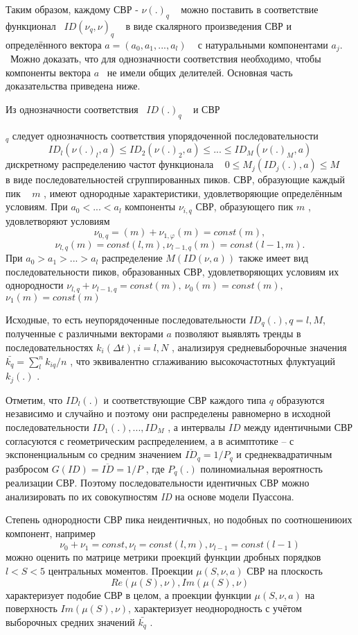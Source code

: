 {{{{ Таким образом, каждому СВР - }$\nu(.)_{q}${ ~ можно
поставить в соответствие функционал ~}$ID(\nu_{q},\nu)_{q}${ ~ в виде
скалярного произведения СВР и определённого вектора }$a=(a_{0},a_{1},...,a_{l})${ ~ с натуральными компонентами }$a_{j}${. ~Можно доказать, что для однозначности соответствия необходимо, чтобы
компоненты вектора  }{ $a$}{ ~не имели общих делителей. Основная часть
доказательства приведена ниже.}

{ Из однозначности соответствия ~}$ID(.)_{q}${ ~ и
СВР}{ $_{q}${  следует однозначность
соответствия упорядоченной последовательности}
\[
ID_{l}(\nu(.)_{l},a)\leq ID_{2}(\nu(.)_{2},a)\leq...\leq ID_{M}(\nu(.)_{M},a)
\]
{ дискретному распределению частот функционала ~ }$0\leq M_{j}(ID_{j}(.),a)\leq M${ ~ в виде последовательностей
 сгруппированных пиков. СВР,
образующие каждый пик ~}{ $m$}{ , имеют однородные характеристики,
удовлетворяющие определённым условиям. При }$a_{0}<...<a_{l}${
компоненты }$\nu_{i,q}${  СВР, образующего пик }{
$m$}{ , удовлетворяют условиям }
\[
\nu_{0,q}=(m)+\nu_{1,\varphi}(m)=const(m),
\]
\[
\nu_{l,q}(m)=const(l,m), \nu_{l-1,q}(m)=const(l-1,m).
\]
{ При }$a_{0}>a_{1}>...>a_{l}${  распределение }$M(ID(\nu,a))${  также имеет вид последовательности пиков, образованных
СВР, удовлетворяющих условиям их однородности }
$ \nu_{l,q}+\nu_{l-1,q}=const(m), ~
 \nu_{0}(m)=const(m),   $
{  }
 $ \nu_{1}(m)=const(m) $

{ Исходные, то есть неупорядоченные последовательности }$ID_{q}(.),  q=l,M${,
полученные с различными векторами  }{ $a$}{  позволяют выявлять тренды в
последовательностях  }$k_{i}(\Delta t),  i=l,N${ , анализируя средневыборочные
значения }$\bar{k_{q}}=\sum\limits_{l}^n k_{iq}/n${ , что эквивалентно сглаживанию
высокочастотных флуктуаций }$k_{j}(.)${ .}

{ Отметим, что }$ID_{l}(.)${  и соответствующие СВР
каждого типа  }{ $q$}{ образуются независимо и случайно и поэтому
они распределены равномерно в исходной последовательности }$ID_{1}(.),...,ID_{M}${ ,  а интервалы
}$ID${  между
идентичными СВР согласуются с геометрическим распределением, а в асимптотике
-- с экспоненциальным со средним значением  }
$\overline{ID}_{q}=1/P_{q}$
{  и
среднеквадратичным разбросом  }$G(ID)=\overline{ID}=1/P${ , где }$P_{q}(.)${
полиномиальная вероятность реализации СВР. Поэтому
последовательности идентичных СВР можно анализировать по их совокупностям
}{ \textit{ID}}{   на основе модели Пуассона.}

{ Степень однородности СВР пика неидентичных, но подобных по
соотношениюих компонент, например}
\[
\nu_{0}+\nu_{1}=const, \nu_{l}=const(l,m), \nu_{l-1}=const(l-1)
\]
{ можно оценить по матрице метрики проекций функции дробных
порядков  }$l<S<5${  центральных моментов. Проекции }$\mu(S,\nu,a)${  СВР на плоскость}
\[
Re(\mu(S),\nu), Im(\mu(S),\nu)
\]
{ характеризует подобие СВР в целом, а проекции функции  }$\mu(S,\nu,a)${
на поверхность }$Im(\mu(S),\nu)$, {
характеризует неоднородность с учётом выборочных средних значений }$\bar{k_{q}}${ .}

}}}}
